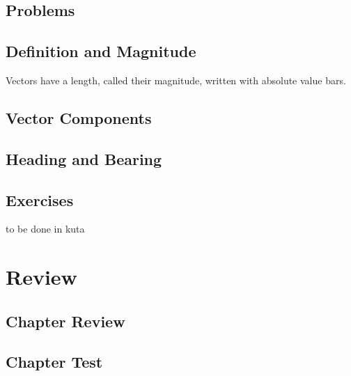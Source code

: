 \newpage
{}
\subsection{Problems}
\noindent{}
\newpage
\subsection{Definition and Magnitude}
Vectors have a length, called their magnitude, written with absolute value bars.
\subsection{Vector Components}
\subsection{Heading and Bearing}
\newpage
\subsection{Exercises}
to be done in kuta

\newpage
\section{Review}
\subsection{Chapter Review}
\subsection{Chapter Test}